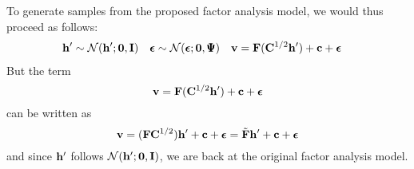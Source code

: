 \begin{exenumerate}
\begin{solution}
  To generate samples from the proposed factor analysis model, we would thus proceed as follows:
  \begin{align}
  \h' &\sim \Gauss(\h'; \zerob, \I) & \epsilonb &\sim \Gauss(\epsilonb; \zerob, \Psib) &  \v &= \F (\C^{1/2}\h') + \c + \epsilonb
  \end{align}
  But the term
  $$ \v = \F (\C^{1/2}\h') + \c + \epsilonb$$
  can be written as
  $$\v = (\F \C^{1/2} ) \h' + \c + \epsilonb = \tilde{\F} \h' + \c + \epsilonb$$
  and since $\h'$ follows $\Gauss(\h'; \zerob, \I)$, we are back at the original factor analysis model.
  
\end{solution}
\end{exenumerate}


\label{ex:ex2}

